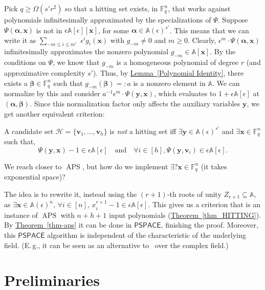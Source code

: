 \documentclass[11pt]{article}
\numberwithin{equation}{section}
\theoremstyle{definition}
\theoremstyle{plain}
\newcommand{\cclass}[1]{\textsf{#1}}
\newcommand{\Eg}{E.\,g.}
\newcommand{\expref}[2]{\hyperref[#2]{#1~\ref{#2}}}
\newcommand{\F}{\mathbb{F}}
\newcommand{\calH}{\mathcal{H}}
\newcommand{\aff}{\mathbb{A}}
\newcommand{\PSPACE}{\cclass{PSPACE}\xspace}  %
\DeclareMathOperator{\APS}{\mathrm{APS}\xspace} %
\begin{document}
Pick $q\ge\Omega(s'r^2)$ so that a hitting set exists, in $\F_q^n$, that works against polynomials infinitesimally approximated by the specializations of $\Psi$. 
Suppose $\Psi(\mathbf{\alpha,x})$ is not in $\epsilon\aff[\epsilon][\mathbf x]$, for some $\mathbf \alpha\in \aff(\epsilon)^{s'}$. This means that we can write it as $\sum_{-m\le i\le m'}$ $\epsilon^i g_i(\mathbf x)$ with $g_{-m}\ne0$ and $m\ge0$. Clearly, $\epsilon^m\cdot \Psi(\mathbf{\alpha,x})$ infinitesimally approximates the nonzero polynomial $g_{-m} \in \aff[\mathbf x]$.
By the conditions on $\Psi$, we know that $g_{-m}$ is a homogeneous 
%
polynomial of degree $r$ %
(and approximative complexity $s'$). Thus, by 
%
%
%
\expref{Lemma}{Polynomial Identity},  %
there exists a $\mathbf \beta\in\F_q^n$ such that $g_{-m}(\mathbf \beta)=:a$ is a nonzero element in $\aff$. We can normalize by this and consider $a^{-1}\epsilon^m\cdot \Psi(\mathbf{y,x})$, which evaluates to $1+\epsilon\aff[\epsilon]$ at $(\mathbf{\alpha,\beta})$. Since this normalization factor only affects the auxiliary variables $\mathbf y$, we get another equivalent criterion:

%
A candidate set %
$\calH= \{\mathbf v_1,\ldots, \mathbf v_h\}$ is \emph{not} a hitting set iff 
$\exists \mathbf y\in \aff(\epsilon)^{s'}$ and $\exists \mathbf x\in \F_q^n$  such that,
  \[
    \Psi(\mathbf{y,x}) - 1 \in \epsilon\aff[\epsilon]\quad\text{and}\quad \forall i\in[h],  \Psi(\mathbf y, \mathbf v_i)\in \epsilon\aff[\epsilon].
  \]

\smallskip
We reach closer to $\APS$, but how do we implement $\exists? \mathbf x\in \F_q^n $ (it takes exponential space)? 

The idea is to rewrite it, instead using the $(r+1)$-th roots of unity $Z_{r+1}\subseteq\aff$, 
%
as %
$\exists \mathbf x\in \aff(\epsilon)^n$, $\forall i\in[n]$, $x_i^{r+1}-1 \in \epsilon\aff[\epsilon]$. This gives us a criterion that is an instance of $\APS$ with $n+h+1$ input polynomials (\expref{Theorem}{thm_HITTING}). By \expref{Theorem}{thm-aps} it can be done in 
%
$\PSPACE$, %
finishing the proof. Moreover, this $\PSPACE$ algorithm 
%
is independent of 
%
the characteristic of the underlying field. %
(\Eg, it can be seen as an alternative to~\cite{forbes2017pspace} over the complex field.)

%

\section{Preliminaries}\label{sec-prelim}
%
\end{document}
